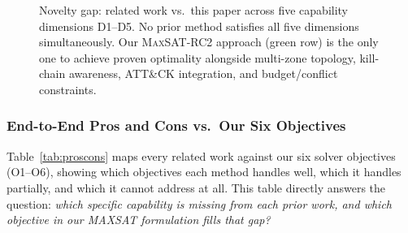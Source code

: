 \documentclass[journal]{IEEEtran}
\newcommand{\cmark}{\textcolor{novelgreen}{\ding{51}}}
\newcommand{\maxsat}{\textsc{MaxSAT}}
\begin{document}
\begin{figure}[!t]
\caption{Novelty gap: related work vs.\ this paper across
five capability dimensions D1--D5.
No prior method satisfies all five dimensions simultaneously.
Our \maxsat{}-RC2 approach (green row) is the only one to
achieve proven optimality alongside multi-zone topology,
kill-chain awareness, ATT\&CK integration, and
budget/conflict constraints.}
\label{fig:novelty_gap}
\end{figure}

\subsubsection{End-to-End Pros and Cons vs.\ Our Six
               Objectives}
\label{subsubsec:proscons}

Table~\ref{tab:proscons} maps every related work against
our six solver objectives (O1--O6), showing which objectives
each method handles well, which it handles partially, and
which it cannot address at all.
This table directly answers the question: \emph{which
specific capability is missing from each prior work, and
which objective in our MAXSAT formulation fills that gap?}
\end{document}
